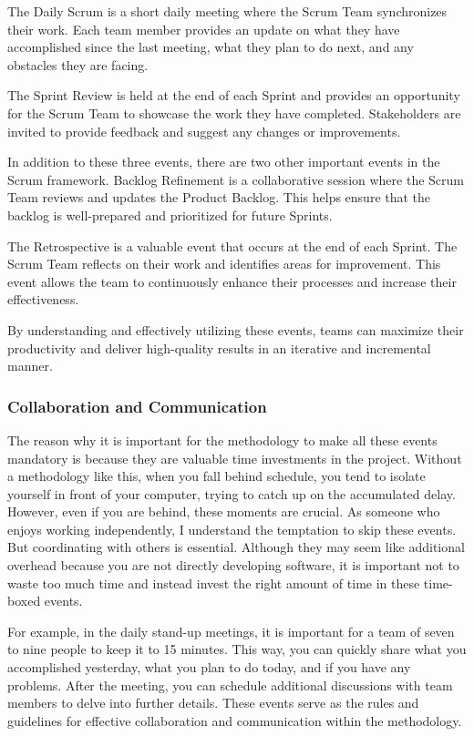 The Daily Scrum is a short daily meeting where the Scrum Team
synchronizes their work. Each team member provides an update on what
they have accomplished since the last meeting, what they plan to do
next, and any obstacles they are facing.

The Sprint Review is held at the end of each Sprint and provides an
opportunity for the Scrum Team to showcase the work they have completed.
Stakeholders are invited to provide feedback and suggest any changes or
improvements.

In addition to these three events, there are two other important events
in the Scrum framework. Backlog Refinement is a collaborative session
where the Scrum Team reviews and updates the Product Backlog. This helps
ensure that the backlog is well-prepared and prioritized for future
Sprints.

The Retrospective is a valuable event that occurs at the end of each
Sprint. The Scrum Team reflects on their work and identifies areas for
improvement. This event allows the team to continuously enhance their
processes and increase their effectiveness.

By understanding and effectively utilizing these events, teams can
maximize their productivity and deliver high-quality results in an
iterative and incremental manner.

\subsubsection{Collaboration and Communication}

The reason why it is important for the methodology to make all these
events mandatory is because they are valuable time investments in the
project. Without a methodology like this, when you fall behind schedule,
you tend to isolate yourself in front of your computer, trying to catch
up on the accumulated delay. However, even if you are behind, these
moments are crucial. As someone who enjoys working independently, I
understand the temptation to skip these events. But coordinating with
others is essential. Although they may seem like additional overhead
because you are not directly developing software, it is important not to
waste too much time and instead invest the right amount of time in these
time-boxed events.

For example, in the daily stand-up meetings, it is important for a team
of seven to nine people to keep it to 15 minutes. This way, you can
quickly share what you accomplished yesterday, what you plan to do
today, and if you have any problems. After the meeting, you can schedule
additional discussions with team members to delve into further details.
These events serve as the rules and guidelines for effective
collaboration and communication within the methodology.

